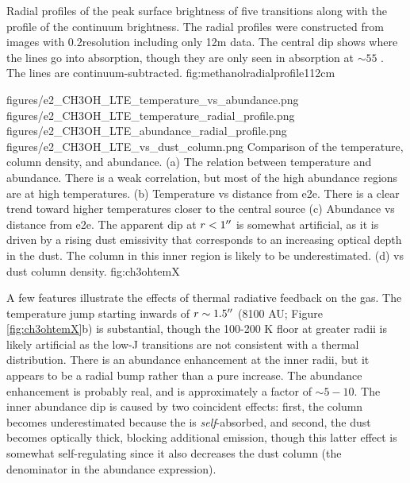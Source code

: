 \documentclass{aa}
\begin{document}
{Radial profiles of the peak surface brightness of five \methanol transitions
along with the profile of the continuum brightness.  The radial profiles were
constructed from images with 0.2\arcsec resolution including only 12m data.
The central dip shows where the lines go into absorption, though they are only
seen in absorption at $\sim55$ \kms.  The \methanol lines are
continuum-subtracted.}
{fig:methanolradialprofile}{1}{12cm}

\FigureFour
{figures/e2_CH3OH_LTE_temperature_vs_abundance.png}
{figures/e2_CH3OH_LTE_temperature_radial_profile.png}
{figures/e2_CH3OH_LTE_abundance_radial_profile.png}
{figures/e2_CH3OH_LTE_vs_dust_column.png}
{Comparison of the \methanol temperature, column density, and abundance.
(a) The relation between temperature and abundance.  There is a weak correlation,
but most of the high abundance regions are at high temperatures.
(b) Temperature vs distance from e2e.  There is a clear trend toward higher
temperatures closer  to the central source
(c) Abundance vs distance from e2e.  The apparent dip at $r<1\mbox{$^{\prime\prime}$}$ is
somewhat artificial, as it is driven by a rising dust emissivity that
corresponds to an increasing optical depth in the dust.  The \methanol column
in this inner region is likely to be underestimated. 
(d) \methanol vs dust column density.  }
{fig:ch3ohtemX}

A few features illustrate the effects of thermal radiative feedback on the gas.
The temperature jump starting inwards of  $r\sim1.5\mbox{$^{\prime\prime}$}$ (8100 AU; Figure
\ref{fig:ch3ohtemX}b) is
substantial, though the 100-200 K floor at greater radii is likely artificial as
the low-J transitions are not consistent with a thermal distribution.
There is an abundance enhancement at the inner radii, but it appears to be a
radial bump rather than a pure increase.  The abundance enhancement is probably real,
and is approximately a factor of $\sim5-10$.  The inner abundance dip
is caused by two coincident effects: first, the \methanol column becomes underestimated
because the \methanol is \emph{self}-absorbed, and second, the dust becomes
optically thick, blocking additional \methanol emission, though this latter
effect is somewhat self-regulating since it also decreases the dust column (the
denominator in the abundance expression).
\end{document}
